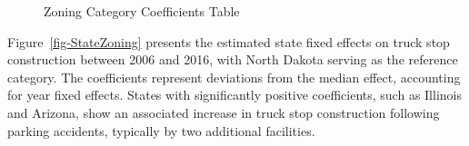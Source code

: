 \documentclass[
  12pt]{article}
\begin{document}
\begin{figure}


\caption{\label{fig-zoning_table}Zoning Category Coefficients Table}

\end{figure}%

Figure~\ref{fig-StateZoning} presents the estimated state fixed effects
on truck stop construction between 2006 and 2016, with North Dakota
serving as the reference category. The coefficients represent deviations
from the median effect, accounting for year fixed effects. States with
significantly positive coefficients, such as Illinois and Arizona, show
an associated increase in truck stop construction following parking
accidents, typically by two additional facilities.
\end{document}
